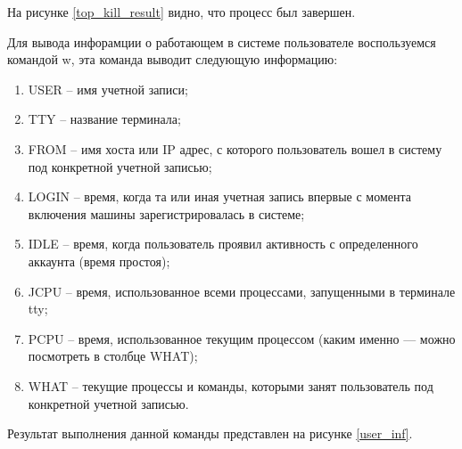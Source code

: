 
На рисунке \ref{top_kill_result} видно, что процесс был завершен.

Для вывода инфорамции о работающем в системе пользователе воспользуемся командой w, эта команда выводит следующую информацию:
\begin{enumerate}
    \item USER – имя учетной записи;
    \item TTY – название терминала;
    \item FROM – имя хоста или IP адрес, с которого пользователь вошел в систему под конкретной учетной записью;
    \item LOGIN – время, когда та или иная учетная запись впервые с момента включения машины зарегистрировалась в системе;
    \item IDLE – время, когда пользователь проявил активность с определенного аккаунта (время простоя);
    \item JCPU – время, использованное всеми процессами, запущенными в терминале tty;
    \item PCPU – время, использованное текущим процессом (каким именно — можно посмотреть в столбце WHAT);
    \item WHAT – текущие процессы и команды, которыми занят пользователь под конкретной учетной записью.
\end{enumerate}

Результат выполнения данной команды представлен на рисунке \ref{user_inf}.


